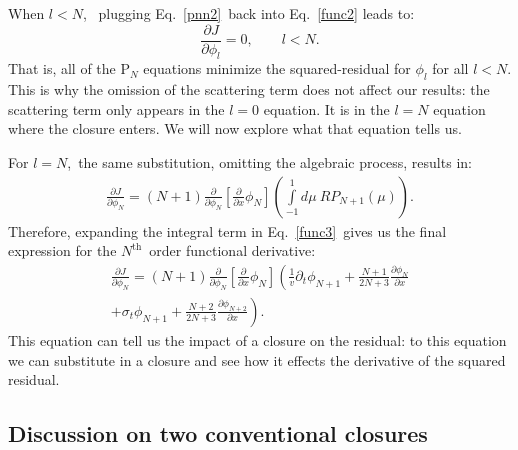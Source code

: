 \documentclass[review]{elsarticle}
\newcommand{\pn}{P$_N$}
\newcommand{\psii}[1]{\phi_\ensuremath{{#1}}}
\begin{document}
When $l < N$,~
plugging Eq.~\eqref{pnn2}~back into Eq.~\eqref{func2} leads to:
\begin{equation}
\frac{\partial J}{\partial\psii{l}}=0, \qquad l < N.
\end{equation}
That is,  all of the P$_N$ equations minimize the squared-residual for $\phi_l$ for all $l<N$. This is why the omission of the scattering term does not affect our results: the scattering term only appears in the $l=0$ equation. It is in the $l=N$ equation where the closure enters. We will now explore what that equation tells us.

For $l=N$,~the same substitution, omitting the algebraic process, results in:
\begin{align}\label{func3}
\frac{\partial J}{\partial\psii{N}}=(N+1)
\frac{\partial}{\partial\psii{N}}\left[\frac{\partial}{\partial x}\psii{N}\right]
\left(\int\limits_{-1}^{1}d\mu~RP_{N+1}(\mu)\right).
\end{align}
Therefore, expanding the integral term in Eq.~\eqref{func3}~gives us the final expression for the $N^\mathrm{th}$~order functional derivative:
\begin{multline}\label{func4}
\frac{\partial J}{\partial\psii{N}}=(N+1)
\frac{\partial}{\partial\psii{N}}\left[\frac{\partial}{\partial x}\psii{N}\right]
\left(\frac{1}{v}\partial_t\phi_{N+1}+\frac{N+1}{2N+3}\frac{\partial\phi_{N}}{\partial x}\right.\\
\left.+\sigma_{t}\phi_{N+1}+\frac{N+2}{2N+3}\frac{\partial\phi_{N+2}}{\partial x}\right).
\end{multline}
This equation can tell us the impact of a closure on the residual: to this equation we can substitute in a closure and see how it effects the derivative of the squared residual.


\subsection{Discussion on two conventional closures}\label{s:above}
\end{document}
